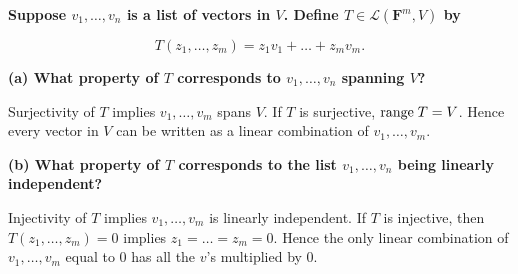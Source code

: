 \documentclass[a5paper]{article}
\begin{document}
\newcommand    \C  { \mathbf{C} }
\newcommand    \R  { \mathbf{R} }
\renewcommand  \L  { \mathcal{L} }
\newcommand    \F  { \mathbf{F} }
\renewcommand \P           {\mathcal{P}}
\newcommand   \question[1] {\textbf{\boldmath#1\unboldmath}\par}
\newcommand   \op          {\operatorname}

\question{
    Suppose $v_1,\dots,v_n$ is a list of vectors in $V$.
    Define $T \in \L(\F^m, V)$ by
}
\begin{equation*}
        T(z_1,\dots,z_m) = z_1v_1 + \dots + z_mv_m .
\end{equation*}

\question{(a) What property of $T$ corresponds to $v_1,\dots,v_n$ spanning $V$?}

Surjectivity of $T$ implies $v_1,\dots,v_m$ spans $V$.
If $T$ is surjective, $\text{range\;}T = V$.
Hence every vector in $V$ can be written as a linear combination of $v_1,\dots,v_m$.

\question{(b) What property of $T$ corresponds to the list $v_1,\dots,v_n$ being linearly independent?}

Injectivity of $T$ implies $v_1,\dots,v_m$ is linearly independent.
If $T$ is injective, then $T(z_1,\dots,z_m)=0$ implies $z_1 = \dots = z_m = 0$.
Hence the only linear combination of $v_1,\dots,v_m$ equal to 0 has all the $v$'s multiplied by 0.
\end{document}
